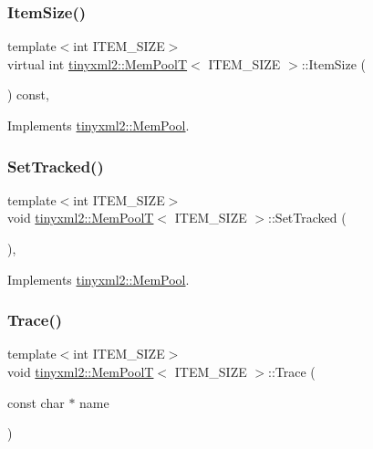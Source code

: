 \subsubsection{\texorpdfstring{Item\+Size()}{ItemSize()}}
{\footnotesize\ttfamily template$<$int I\+T\+E\+M\+\_\+\+S\+I\+ZE$>$ \\
virtual int \hyperlink{classtinyxml2_1_1_mem_pool_t}{tinyxml2\+::\+Mem\+PoolT}$<$ I\+T\+E\+M\+\_\+\+S\+I\+ZE $>$\+::Item\+Size (\begin{DoxyParamCaption}{ }\end{DoxyParamCaption}) const\hspace{0.3cm}{\ttfamily [inline]}, {\ttfamily [virtual]}}



Implements \hyperlink{classtinyxml2_1_1_mem_pool_a0c518d49e3a94bde566f61e13b7240bb}{tinyxml2\+::\+Mem\+Pool}.

\mbox{\label{classtinyxml2_1_1_mem_pool_t_aee3c611215ae08cce41a940bf2763027}} 
\subsubsection{\texorpdfstring{Set\+Tracked()}{SetTracked()}}
{\footnotesize\ttfamily template$<$int I\+T\+E\+M\+\_\+\+S\+I\+ZE$>$ \\
void \hyperlink{classtinyxml2_1_1_mem_pool_t}{tinyxml2\+::\+Mem\+PoolT}$<$ I\+T\+E\+M\+\_\+\+S\+I\+ZE $>$\+::Set\+Tracked (\begin{DoxyParamCaption}{ }\end{DoxyParamCaption})\hspace{0.3cm}{\ttfamily [inline]}, {\ttfamily [virtual]}}



Implements \hyperlink{classtinyxml2_1_1_mem_pool_ac5804dd1387b2e4de5eef710076a0db1}{tinyxml2\+::\+Mem\+Pool}.

\mbox{\label{classtinyxml2_1_1_mem_pool_t_a47eefbd934ef70d973ea41d41ab5f239}} 
\subsubsection{\texorpdfstring{Trace()}{Trace()}}
{\footnotesize\ttfamily template$<$int I\+T\+E\+M\+\_\+\+S\+I\+ZE$>$ \\
void \hyperlink{classtinyxml2_1_1_mem_pool_t}{tinyxml2\+::\+Mem\+PoolT}$<$ I\+T\+E\+M\+\_\+\+S\+I\+ZE $>$\+::Trace (\begin{DoxyParamCaption}\item[{const char $\ast$}]{name }\end{DoxyParamCaption})\hspace{0.3cm}{\ttfamily [inline]}}

